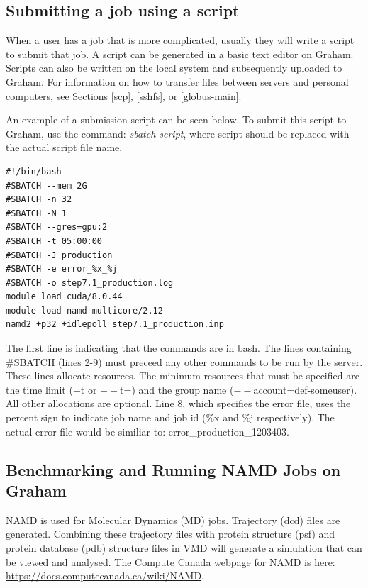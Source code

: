 \documentclass[12pt]{article}
\begin{document}
\subsection{Submitting a job using a script}

\quad When a user has a job that is more complicated, usually they will write a script to submit that job. A script can be generated in a basic text editor on Graham. Scripts can also be written on the local system and subsequently uploaded to Graham. For information on how to transfer files between servers and personal computers, see Sections \ref{scp}, \ref{sshfs}, or \ref{globus-main}. 

\quad An example of a submission script can be seen below. To submit this script to Graham, use the command: \textit{sbatch script}, where script should be replaced with the actual script file name.

\begin{lstlisting}
#!/bin/bash
#SBATCH --mem 2G
#SBATCH -n 32
#SBATCH -N 1
#SBATCH --gres=gpu:2
#SBATCH -t 05:00:00
#SBATCH -J production
#SBATCH -e error_%x_%j
#SBATCH -o step7.1_production.log
module load cuda/8.0.44
module load namd-multicore/2.12
namd2 +p32 +idlepoll step7.1_production.inp
\end{lstlisting}

\quad The first line is indicating that the commands are in bash. The lines containing \#SBATCH (lines 2-9) must preceed any other commands to be run by the server. These lines allocate resources. The minimum resources that must be specified are the time limit ($-$t or $--$t=) and the group name ($--$account=def-someuser). All other allocations are optional. Line 8, which specifies the error file, uses the percent sign to indicate job name and job id (\%x and \%j respectively). The actual error file would be similiar to: error\_production\_1203403.

\subsection{Benchmarking and Running NAMD Jobs on Graham}

\quad NAMD is used for Molecular Dynamics (MD) jobs. Trajectory (dcd) files are generated. Combining these trajectory files with protein structure (psf) and protein database (pdb) structure files in VMD will generate a simulation that can be viewed and analysed. The Compute Canada webpage for NAMD is here: \url{https://docs.computecanada.ca/wiki/NAMD}. 
\end{document}
